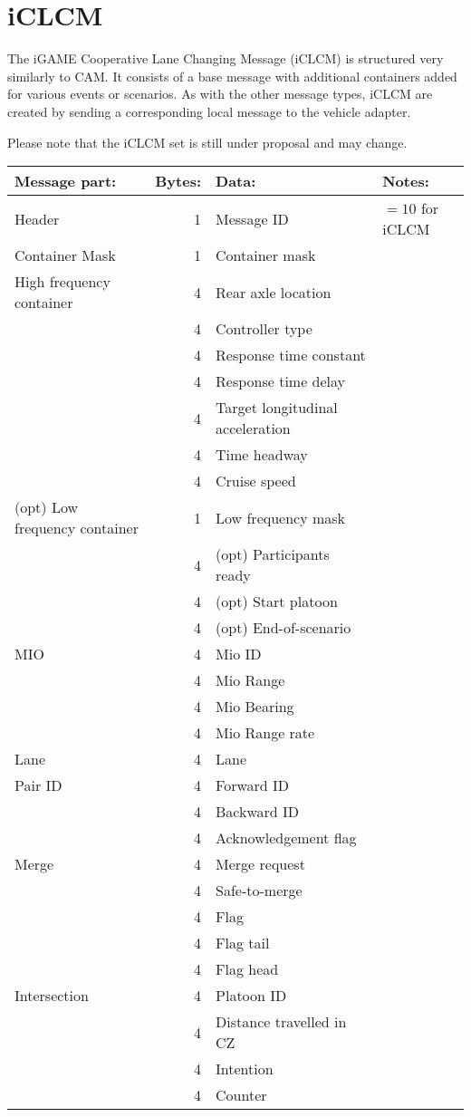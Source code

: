 \documentclass[11pt]{article}
\begin{document}
\section{iCLCM}
\label{sec:orgheadline4}
The iGAME Cooperative Lane Changing Message (iCLCM) is structured very
similarly to CAM. It consists of a base message with additional
containers added for various events or scenarios. As with the other
message types, iCLCM are created by sending a corresponding local
message to the vehicle adapter.

Please note that the iCLCM set is still under proposal and may change.


\begin{center}
\begin{tabular}{lrll}
Message part: & Bytes: & Data: & Notes:\\
\hline
Header & 1 & Message ID & \(=10\) for iCLCM\\
\hline
Container Mask & 1 & Container mask & \\
\hline
High frequency container & 4 & Rear axle location & \\
 & 4 & Controller type & \\
 & 4 & Response time constant & \\
 & 4 & Response time delay & \\
 & 4 & Target longitudinal acceleration & \\
 & 4 & Time headway & \\
 & 4 & Cruise speed & \\
\hline
(opt) Low frequency container & 1 & Low frequency mask & \\
 & 4 & (opt) Participants ready & \\
 & 4 & (opt) Start platoon & \\
 & 4 & (opt) End-of-scenario & \\
\hline
MIO & 4 & Mio ID & \\
 & 4 & Mio Range & \\
 & 4 & Mio Bearing & \\
 & 4 & Mio Range rate & \\
\hline
Lane & 4 & Lane & \\
\hline
Pair ID & 4 & Forward ID & \\
 & 4 & Backward ID & \\
 & 4 & Acknowledgement flag & \\
\hline
Merge & 4 & Merge request & \\
 & 4 & Safe-to-merge & \\
 & 4 & Flag & \\
 & 4 & Flag tail & \\
 & 4 & Flag head & \\
\hline
Intersection & 4 & Platoon ID & \\
 & 4 & Distance travelled in CZ & \\
 & 4 & Intention & \\
 & 4 & Counter & \\
\end{tabular}
\end{center}
\end{document}
